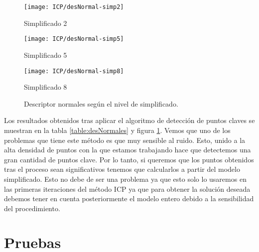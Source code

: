 \begin{figure}[h!]
	\begin{minipage}[b]{0.5\textwidth}
		\centering
		\texttt{[image: ICP/desNormal-simp2]}
		\caption*{Simplificado 2}
	\end{minipage}
	\begin{minipage}[b]{0.5\textwidth}
		\centering
		\texttt{[image: ICP/desNormal-simp5]}
		\caption*{Simplificado 5}
	\end{minipage}
	\begin{center}
		\begin{minipage}[b]{0.5\textwidth}
		\centering
		\texttt{[image: ICP/desNormal-simp8]}
		\caption*{Simplificado 8}
	\end{minipage}
	\end{center}
	\caption{Descriptor normales según el nivel de simplificado.}
	\label{Ej_simpli_real}
\end{figure}
Los resultados obtenidos tras aplicar el algoritmo de detección de puntos claves se muestran en la tabla \ref{table:desNormales} y figura \ref{Ej_simpli_real}. Vemos que uno de los problemas que tiene este método es que muy sensible al ruido. Esto, unido a la alta densidad de puntos con la que estamos trabajando hace que detectemos una gran cantidad de puntos clave. Por lo tanto, si queremos que los puntos obtenidos tras el proceso sean significativos tenemos que calcularlos a partir del modelo simplificado. Esto no debe de ser una problema ya que esto solo lo usaremos en las primeras iteraciones del método ICP ya que para obtener la solución deseada debemos tener en cuenta posteriormente el modelo entero debido a la sensibilidad del procedimiento. 

\section{Pruebas}
